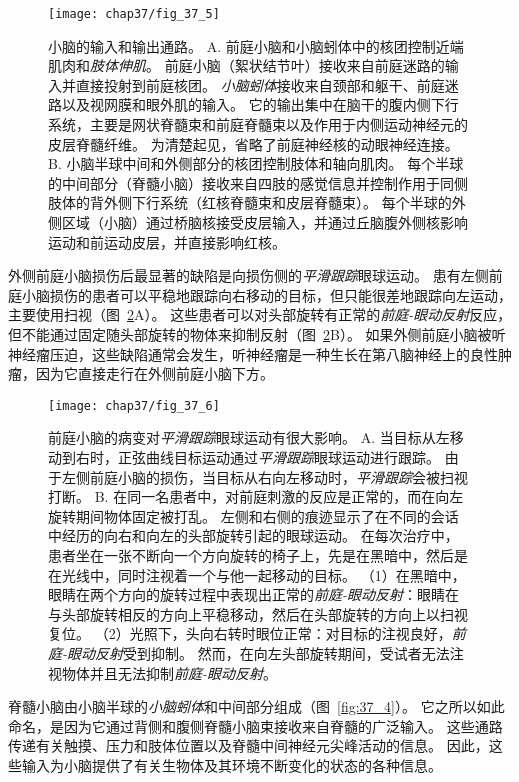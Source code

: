 \begin{figure}[htbp]
	\centering
	\texttt{[image: chap37/fig\_37\_5]}
	\caption{小脑的输入和输出通路。
		A. 前庭小脑和小脑蚓体中的核团控制近端肌肉和\textit{肢体伸肌}。
		前庭小脑（絮状结节叶）接收来自前庭迷路的输入并直接投射到前庭核团。
		\textit{小脑蚓体}接收来自颈部和躯干、前庭迷路以及视网膜和眼外肌的输入。
		它的输出集中在脑干的腹内侧下行系统，主要是网状脊髓束和前庭脊髓束以及作用于内侧运动神经元的皮层脊髓纤维。
		为清楚起见，省略了前庭神经核的动眼神经连接。
		B. 小脑半球中间和外侧部分的核团控制肢体和轴向肌肉。
		每个半球的中间部分（脊髓小脑）接收来自四肢的感觉信息并控制作用于同侧肢体的背外侧下行系统（红核脊髓束和皮层脊髓束）。
		每个半球的外侧区域（小脑）通过桥脑核接受皮层输入，并通过丘脑腹外侧核影响运动和前运动皮层，并直接影响红核。}
	\label{fig:37_5}
\end{figure}


外侧前庭小脑损伤后最显著的缺陷是向损伤侧的\textit{平滑跟踪}眼球运动。
患有左侧前庭小脑损伤的患者可以平稳地跟踪向右移动的目标，但只能很差地跟踪向左运动，主要使用扫视（图~\ref{fig:37_6}A）。
这些患者可以对头部旋转有正常的\textit{前庭-眼动反射}反应，但不能通过固定随头部旋转的物体来抑制反射（图~\ref{fig:37_6}B）。
如果外侧前庭小脑被听神经瘤压迫，这些缺陷通常会发生，听神经瘤是一种生长在第八脑神经上的良性肿瘤，因为它直接走行在外侧前庭小脑下方。


\begin{figure}[htbp]
	\centering
	\texttt{[image: chap37/fig\_37\_6]}
	\caption{前庭小脑的病变对\textit{平滑跟踪}眼球运动有很大影响。
		A. 当目标从左移动到右时，正弦曲线目标运动通过\textit{平滑跟踪}眼球运动进行跟踪。
		由于左侧前庭小脑的损伤，当目标从右向左移动时，\textit{平滑跟踪}会被扫视打断。
		B. 在同一名患者中，对前庭刺激的反应是正常的，而在向左旋转期间物体固定被打乱。
		左侧和右侧的痕迹显示了在不同的会话中经历的向右和向左的头部旋转引起的眼球运动。
		在每次治疗中，患者坐在一张不断向一个方向旋转的椅子上，先是在黑暗中，然后是在光线中，同时注视着一个与他一起移动的目标。
		（1）在黑暗中，眼睛在两个方向的旋转过程中表现出正常的\textit{前庭-眼动反射}：眼睛在与头部旋转相反的方向上平稳移动，然后在头部旋转的方向上以扫视复位。
		（2）光照下，头向右转时眼位正常：对目标的注视良好，\textit{前庭-眼动反射}受到抑制。
		然而，在向左头部旋转期间，受试者无法注视物体并且无法抑制\textit{前庭-眼动反射}。}
	\label{fig:37_6}
\end{figure}


脊髓小脑由小脑半球的\textit{小脑蚓体}和中间部分组成（图~\ref{fig:37_4}）。
它之所以如此命名，是因为它通过背侧和腹侧脊髓小脑束接收来自脊髓的广泛输入。
这些通路传递有关触摸、压力和肢体位置以及脊髓中间神经元尖峰活动的信息。
因此，这些输入为小脑提供了有关生物体及其环境不断变化的状态的各种信息。


